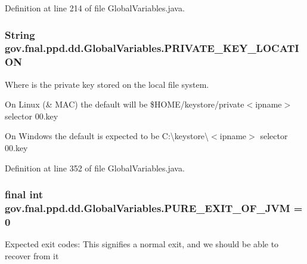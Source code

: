 Definition at line 214 of file Global\-Variables.\-java.

\hypertarget{classgov_1_1fnal_1_1ppd_1_1dd_1_1GlobalVariables_aa26c21d05850efb85c8f5517d8258e5d}{
\subsubsection[{P\-R\-I\-V\-A\-T\-E\-\_\-\-K\-E\-Y\-\_\-\-L\-O\-C\-A\-T\-I\-O\-N}]{\setlength{\rightskip}{0pt plus 5cm}String gov.\-fnal.\-ppd.\-dd.\-Global\-Variables.\-P\-R\-I\-V\-A\-T\-E\-\_\-\-K\-E\-Y\-\_\-\-L\-O\-C\-A\-T\-I\-O\-N\hspace{0.3cm}{\ttfamily [static]}}}\label{classgov_1_1fnal_1_1ppd_1_1dd_1_1GlobalVariables_aa26c21d05850efb85c8f5517d8258e5d}
Where is the private key stored on the local file system.

On Linux (\& M\-A\-C) the default will be \$\-H\-O\-M\-E/keystore/private$<$ipname$>$ selector 00.\-key

On Windows the default is expected to be C\-:\textbackslash{}keystore\textbackslash{}$<$ipname$>$ selector 00.\-key 

Definition at line 352 of file Global\-Variables.\-java.

\hypertarget{classgov_1_1fnal_1_1ppd_1_1dd_1_1GlobalVariables_a9a5a3b99227fe4929fc0c3c664a922da}{
\subsubsection[{P\-U\-R\-E\-\_\-\-E\-X\-I\-T\-\_\-\-O\-F\-\_\-\-J\-V\-M}]{\setlength{\rightskip}{0pt plus 5cm}final int gov.\-fnal.\-ppd.\-dd.\-Global\-Variables.\-P\-U\-R\-E\-\_\-\-E\-X\-I\-T\-\_\-\-O\-F\-\_\-\-J\-V\-M = 0\hspace{0.3cm}{\ttfamily [static]}}}\label{classgov_1_1fnal_1_1ppd_1_1dd_1_1GlobalVariables_a9a5a3b99227fe4929fc0c3c664a922da}
Expected exit codes\-: This signifies a normal exit, and we should be able to recover from it 

